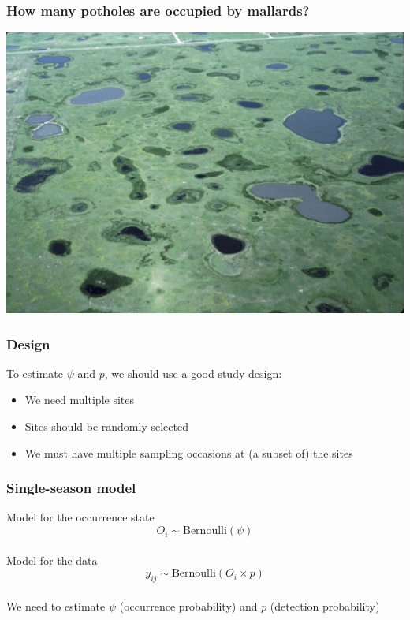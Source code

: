 \documentclass[color=usenames,dvipsnames]{beamer}\usepackage[]{graphicx}\usepackage[]{color}
\begin{document}
\begin{frame}
  \frametitle{\normalsize How many potholes are occupied by mallards?}
  \begin{center}
    \includegraphics[width=\textwidth]{figs/Prairie_Pothole_Wetlands}
  \end{center}
\end{frame}





\begin{frame}
  \frametitle{Design}
  \large
  To estimate $\psi$ and $p$, we should use a good study design:
  \begin{itemize}[<+->]
    \item We need multiple sites
    \item Sites should be randomly selected
    \item We must have multiple sampling occasions at (a subset of) the sites
  \end{itemize}
\end{frame}





\begin{frame}
  \frametitle{Single-season model}
  \Large
  {\centering Model for the occurrence state}
  \[
    O_{i} \sim \mbox{Bernoulli}(\psi)
  \] \\
  \pause
  \vspace{0.4cm}
  {\centering Model for the data}
  \[
    y_{ij} \sim \mbox{Bernoulli}(O_i \times p)
  \] \\
  \pause
  \vspace{0.5cm}
  We need to estimate $\psi$ (occurrence probability) and $p$ (detection probability)
\end{frame}
\end{document}
